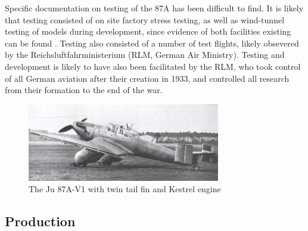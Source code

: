 \documentclass[a4paper, fontsize=11pt]{scrartcl} %
\begin{document}
Specific documentation on testing of the 87A has been difficult to
find. It is likely that testing consisted of on site
factory stress testing, as well as wind-tunnel testing of models during
development, since evidence of both facilities existing can be found
\autocite{hirschel03}. Testing also consisted of a number of test
flights, likely obsevered by the Reichsluftfahrministerium (RLM, German
Air Ministry). Testing and development is likely to have also been
facilitated by the RLM, who took control of all German aviation after their creation
in 1933, and controlled all research from their formation to the end of
the war.

\begin{figure}[h]
  \centering
  \includegraphics[width=0.75\textwidth]{media/ju87av0}
  \caption{The Ju 87A-V1 with twin tail fin and Kestrel engine
    \autocite{junkers87}}
  \label{fig:v1}
\end{figure}
\subsection{Production}
\printbibliography
\end{document}
